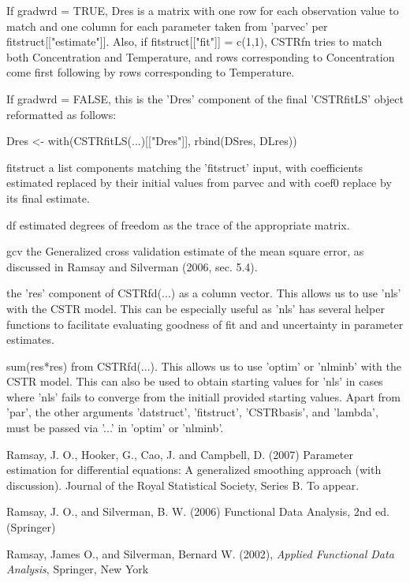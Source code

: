 \begin{Value}
\begin{ldescription}
{If gradwrd = TRUE, Dres is a matrix with one row for each
observation value to match and one column for each parameter
taken from 'parvec' per fitstruct[["estimate"]].  Also, if
fitstruct[["fit"]] = c(1,1), CSTRfn tries to  match both
Concentration and Temperature, and rows corresponding to
Concentration come first following by rows corresponding to
Temperature. 

If gradwrd = FALSE, this is the 'Dres' component of the final
'CSTRfitLS' object reformatted as follows:  

Dres <- with(CSTRfitLS(...)[["Dres"]], rbind(DSres, DLres))

\item[fitstruct] a list components matching the 'fitstruct' input, with
coefficients estimated replaced by their initial values from
parvec and with coef0 replace by its final estimate. 

\item[df] estimated degrees of freedom as the trace of the appropriate
matrix. 

\item[gcv] the Generalized cross validation estimate of the mean square
error, as discussed in Ramsay and Silverman (2006, sec. 5.4).   

} 

\item[\code{CSTRres, CSTRres0}] the 'res' component of CSTRfd(...) as a column vector.  This allows
us to use 'nls' with the CSTR model.  This can be especially useful
as 'nls' has several helper functions to facilitate evaluating
goodness of fit and and uncertainty in parameter estimates.  

\item[\code{CSTRsse}] sum(res*res) from CSTRfd(...).  This allows us to use 'optim' or
'nlminb' with the CSTR model.  This can also be used to obtain
starting values for 'nls' in cases where 'nls' fails to converge
from the initiall provided starting values.  Apart from 'par', the
other arguments 'datstruct', 'fitstruct', 'CSTRbasis', and 'lambda',
must be passed via '...' in 'optim' or 'nlminb'.  

\end{ldescription}
\end{Value}
\begin{References}\relax
Ramsay, J. O., Hooker, G., Cao, J. and Campbell, D. (2007) Parameter
estimation for differential equations: A generalized smoothing
approach (with discussion). Journal of the Royal Statistical Society,
Series B. To appear.

Ramsay, J. O., and Silverman, B. W. (2006) Functional Data Analysis,
2nd ed. (Springer)

Ramsay, James O., and Silverman, Bernard W. (2002), \emph{Applied
Functional Data Analysis}, Springer, New York
\end{References}
